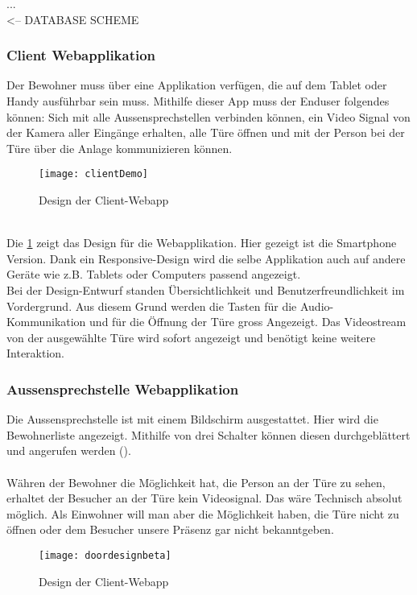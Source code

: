 ...
\\
<-- DATABASE SCHEME

\subsubsection{Client Webapplikation}
Der Bewohner muss über eine Applikation verfügen, die auf dem Tablet oder Handy ausführbar sein muss. Mithilfe dieser App muss der Enduser folgendes können: Sich mit alle Aussensprechstellen verbinden können, ein Video Signal von der Kamera aller Eingänge erhalten, alle Türe öffnen und mit der Person bei der Türe über die Anlage kommunizieren können.
\\
\begin{figure}[htb!]
	\begin{center}
		\texttt{[image: clientDemo]}
		\caption[Design der Client-Webapp]{Design der Client-Webapp}
		\label{fig:clientDemo}
	\end{center}
\end{figure}
\\
Die \cref{fig:clientDemo} zeigt das Design für die Webapplikation. Hier gezeigt ist die Smartphone Version. Dank ein Responsive-Design wird die selbe Applikation auch auf andere Geräte wie z.B. Tablets oder Computers passend angezeigt.
\\ 
Bei der Design-Entwurf standen Übersichtlichkeit und Benutzerfreundlichkeit im Vordergrund. Aus diesem Grund werden die Tasten für die Audio-Kommunikation und für die Öffnung der Türe gross Angezeigt. Das Videostream von der ausgewählte Türe wird sofort angezeigt und benötigt keine weitere Interaktion. 

\subsubsection{Aussensprechstelle Webapplikation}
Die Aussensprechstelle ist mit einem Bildschirm ausgestattet. Hier wird die Bewohnerliste angezeigt. Mithilfe von drei Schalter können diesen durchgeblättert und angerufen werden ().
\\
\\
Währen der Bewohner die Möglichkeit hat, die Person an der Türe zu sehen, erhaltet der Besucher an der Türe kein Videosignal. Das wäre Technisch absolut möglich. Als Einwohner will man aber die Möglichkeit haben, die Türe nicht zu öffnen oder dem Besucher unsere Präsenz gar nicht bekanntgeben. 


\begin{figure}[htb!]
	\begin{center}
		\texttt{[image: doordesignbeta]}
		\caption[Design der Client-Webapp]{Design der Client-Webapp}
		\label{fig:doordesign}
	\end{center}
\end{figure}

